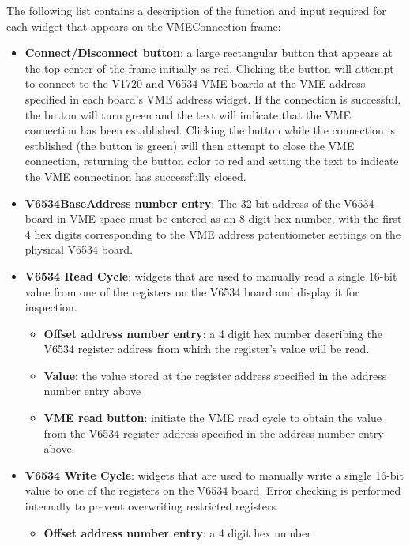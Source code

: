 The following list contains a description of the function and input
required for each widget that appears on the VMEConnection frame:
\begin{itemize}
\item{\textbf{Connect/Disconnect button}: a large rectangular button
    that appears at the top-center of the frame initially as
    red. Clicking the button will attempt to connect to the V1720 and
    V6534 VME boards at the VME address specified in each board's VME
    address widget. If the connection is successful, the button will
    turn green and the text will indicate that the VME connection has
    been established. Clicking the button while the connection is
    estblished (the button is green) will then attempt to close the
    VME connection, returning the button color to red and setting the
    text to indicate the VME connectinon has successfully closed.}
  \item{\textbf{V6534BaseAddress number entry}: The 32-bit address of
      the V6534 board in VME space must be entered as an 8 digit hex
      number, with the first 4 hex digits corresponding to the VME
      address potentiometer settings on the physical V6534 board.}
  \item{\textbf{V6534 Read Cycle}: widgets that are used to manually
      read a single 16-bit value from one of the registers on the
      V6534 board and display it for inspection.
      \begin{itemize}
      \item{\textbf{Offset address number entry}: a 4 digit hex number
          describing the V6534 register address from which the
          register's value will be read.}
      \item{\textbf{Value}: the value stored at the register address
          specified in the address number entry above}
      \item{\textbf{VME read button}: initiate the VME read cycle to
          obtain the value from the V6534 register address specified
          in the address number entry above.}
      \end{itemize}
    }
  \item{\textbf{V6534 Write Cycle}: widgets that are used to manually
      write a single 16-bit value to one of the registers on the V6534
      board. Error checking is performed internally to prevent
      overwriting restricted registers.
      \begin{itemize}
      \item{\textbf{Offset address number entry}: a 4 digit hex number
}
\end{itemize}}
\end{itemize}
